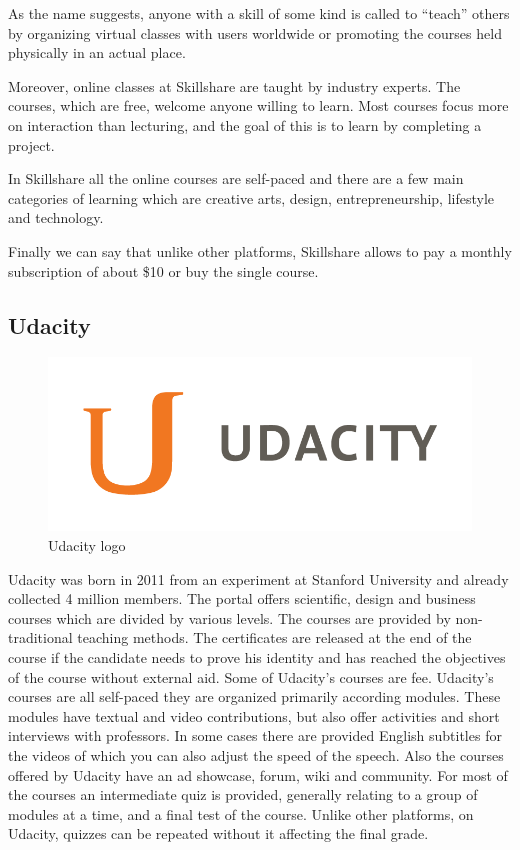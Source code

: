As the name suggests, anyone with a skill of some kind is called to “teach” others by organizing virtual classes with users worldwide or promoting the courses held physically in an actual place.

Moreover, online classes at Skillshare are taught by industry experts. The courses, which are free, welcome anyone willing to learn. Most courses focus more on interaction than lecturing, and the goal of this is to learn by completing a project.

In Skillshare all the online courses are self-paced and there are a few main categories of learning which are creative arts, design, entrepreneurship, lifestyle and technology.

Finally we can say that unlike other platforms, Skillshare allows to pay a monthly subscription of about \$10 or buy the single course.


\subsection{Udacity}
\label{subsec:udacity}
\begin{figure}[htb] %
 \centering
 \includegraphics[width=0.5\linewidth]{images/chapter1/udacity.png}\hfill
 \caption[Udacity logo]{Udacity logo}
 \label{fig:fourV}
\end{figure}

Udacity was born in 2011 from an experiment at Stanford University and already collected 4 million members. The portal offers scientific, design and business courses which are divided by various levels. The courses are provided by non-traditional teaching methods.
The certificates are released at the end of the course if the candidate needs to prove his identity and has reached the objectives of the course without external aid. Some of Udacity's courses are fee.
Udacity’s courses are all self-paced they are organized primarily according modules. These modules have textual and video contributions, but also offer activities and short interviews with professors. In some cases there are provided English subtitles for the videos of which you can also adjust the speed of the speech.
Also the courses offered by Udacity have an ad showcase, forum, wiki and community. For most of the courses an intermediate quiz is provided, generally relating to a group of modules at a time, and a final test of the course. Unlike other platforms, on Udacity, quizzes can be repeated without it affecting the final grade.

